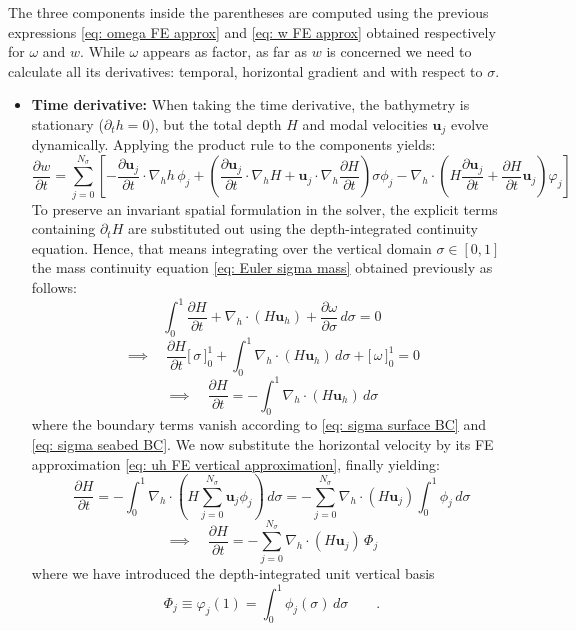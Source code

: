 \documentclass{article}
\newcommand{\Ns}{N_\sigma}
\newcommand{\uh}{\mathbf{u}_h}
\newcommand{\uj}{\mathbf{u}_j}
\newcommand{\sumj}{\sum_{j=0}^{\Ns}}
\newcommand{\nablah}{\nabla_h}
\newcommand{\ddt}[1]{\frac{\partial #1}{\partial t}}
\newcommand{\dds}[1]{\frac{\partial #1}{\partial \sigma}}
\newcommand{\vphij}{\varphi_j}
\begin{document}
The three components inside the parentheses are computed using the previous expressions \eqref{eq: omega FE approx} and \eqref{eq: w FE approx} obtained respectively for $\omega$ and $w$. 
While $\omega$ appears as factor, as far as $w$ is concerned we need to calculate all its derivatives: temporal, horizontal gradient and with respect to $\sigma$. 
\begin{itemize}
    \item \textbf{Time derivative:}
    When taking the time derivative, the bathymetry is stationary ($\partial_t h = 0$), but the total depth $H$ and modal velocities $\uj$ evolve dynamically. Applying the product rule to the components yields:
    $$\ddt{w} = \sumj \left[ -\frac{\partial \uj}{\partial t} \cdot \nablah h \,\phi_j + \left(\frac{\partial \uj}{\partial t} \cdot \nablah H + \uj \cdot \nablah \ddt{H}\right)\sigma \phi_j - \nablah \cdot \left(H \frac{\partial \uj}{\partial t} + \ddt{H}\uj\right)\vphij \right]$$
    To preserve an invariant spatial formulation in the solver, the explicit terms containing $\partial_t H$ are substituted out using the depth-integrated continuity equation. 
    Hence, that means integrating over the vertical domain $\sigma \in[0,1]$ the mass continuity equation \eqref{eq: Euler sigma mass} obtained previously as follows:
    $$\int_0^1\ddt{H} + \nablah \cdot \left(H\uh\right) +\dds{\omega} \, d\sigma  = 0 $$
    $$\implies \quad \ddt{H} \big[\, \sigma \,\big]_0^1 + \int_0^1  \nablah \cdot \left(H\uh\right) \,d\sigma +\big[ \,\omega \,\big]_0^1 = 0 $$
    $$\implies \quad \ddt{H} = - \int_0^1  \nablah \cdot \left(H\uh\right) \,d\sigma $$
    where the boundary terms vanish according to \eqref{eq: sigma surface BC} and \eqref{eq: sigma seabed BC}.
    We now substitute the horizontal velocity by its FE approximation \eqref{eq: uh FE vertical approximation}, finally yielding:
    $$\ddt{H} = - \int_0^1  \nablah \cdot \left( H \sumj \uj \phi_j \right) \,d\sigma = - \sumj \nablah \cdot \left( H \uj \right) \int_0^1 \phi_j \,d\sigma$$
    \begin{equation}
        \implies \quad \boxed{\ddt{H} = - \sumj\nablah \cdot \left( H \uj\right) \, \Phi_j}
        \label{eq: depth integrated mass continuity}
    \end{equation}
    where we have introduced the depth-integrated unit vertical basis 
    \begin{equation}
    \Phi_j \equiv \vphij(1) = \int_0^1 \phi_j(\sigma) \,d\sigma\qquad.
    \label{eq: def depth-integrated unit basis}
    \end{equation}


\end{itemize}
\end{document}
